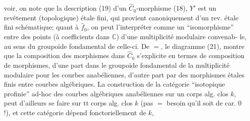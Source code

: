 voir, on note que  la description (19) d'un
$\widehat C_0$-morphisme (18), $Y'$ est un revêtement (topologique)
étale fini, qui provient canoniquement
d'un rev. étale fini schématique; quant à
$\widehat f_0$, on peut l'interpréter comme un
``isomorphisme''   entre des points (à coefficients
dans $\mathbb C$) d'une multiplicité modulaire convenab-
le, au sens du groupoïde fondamental
de celle-ci. De $=$, le diagramme (21),
montre que la composition des morphismes
dans $\widehat C_0$ s'explicite en termes de composition
de morphismes, d'une part dans le groupoïde
fondamental de la multiplicité modulaire
pour les courbes anabéliennes, d'autre part
par des morphismes étales finis entre courbes
algébriques. La construction de la catégorie
``isotopique profinie'' ad-hoc des courbes algébriques anabéliennes
sur un corps alg. clos $k$, peut d'ailleurs
se faire sur tt corps alg. clos $k$
(pas $=$ besoin qu'il soit de car. $0$ !), et
cette catégorie dépend fonctoriellement de $k$,
